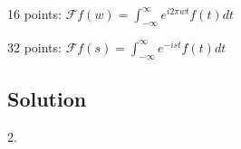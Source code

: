 16 points: $\displaystyle \mathcal{F}f(w)=\int_{-\infty}^{\infty} e^{i 2 \pi w t} f(t) dt$

32 points: $\displaystyle \mathcal{F}f(s)=\int_{-\infty}^{\infty} e^{-i s t} f(t) dt$

\subsection*{Solution}
2.\\












